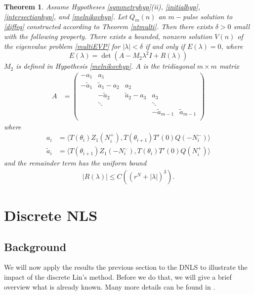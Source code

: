 \documentclass[12pt]{article}
\newtheorem{theorem}{Theorem}
\begin{document}
\begin{theorem}\label{stabilitytheorem}
Assume Hypotheses \ref{symmetryhyp}(ii), \ref{initialhyp}, \ref{intersectionhyp}, and \eqref{melnikovhyp}. Let $Q_m(n)$ an $m-$pulse solution to \eqref{diffeq} constructed according to Theorem \ref{ntmulti}. Then there exists $\delta > 0$ small with the following property. There exists a bounded, nonzero solution $V(n)$ of the eigenvalue problem \eqref{multiEVP} for $|\lambda| < \delta$ if and only if $E(\lambda) = 0$, where
\begin{equation}\label{Elambda}
E(\lambda) = \det(A - M_2 \lambda^2 I + R(\lambda))
\end{equation}
$M_2$ is defined in Hypothesis \eqref{melnikovhyp}. $A$ is the tridiagonal $m \times m$ matrix
\begin{align}\label{matrixA}
A &= \begin{pmatrix}
-a_1 & a_1 & & & \\
-\tilde{a}_1 & \tilde{a}_1 - a_2 & a_2 \\
& -\tilde{a}_2 & \tilde{a}_2 - a_3 & a_3 \\
& \ddots & & \ddots \\
& & & -\tilde{a}_{m-1} & \tilde{a}_{m-1}  \\
\end{pmatrix}
\end{align}
where
\begin{align*}
a_i &= \langle T(\theta_i) Z_1(N_i^+), T(\theta_{i+1}) T'(0)Q(-N_i^-) \rangle \\
\tilde{a}_i &= \langle T(\theta_{i+1}) Z_1(-N_i^-), T(\theta_i) T'(0)Q(N_i^+) \rangle
\end{align*}
and the remainder term has the uniform bound
\begin{align}\label{Rbound2}
|R(\lambda)| \leq C\left( (r^N + |\lambda|)^3 \right).
\end{align}
\end{theorem}

\section{Discrete NLS}

\subsection{Background}

We will now apply the results the previous section to the 
DNLS to illustrate the impact of the discrete Lin's method. Before we do that, we will give a brief overview what is already known. Many more details can be found in \cite{Kevrekidis2009,pelinovsky_2011}. 
\end{document}
